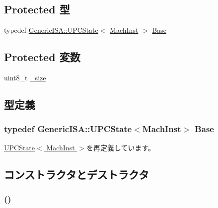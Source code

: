 \subsection*{Protected 型}
\begin{DoxyCompactItemize}
\item 
typedef \hyperlink{classGenericISA_1_1UPCState}{GenericISA::UPCState}$<$ \hyperlink{namespaceX86ISA_a7ceadb544bf9b4a10579b7466b0ac008}{MachInst} $>$ \hyperlink{classX86ISA_1_1PCState_aa6c21965de6773cbfc732c23d7263a9f}{Base}
\end{DoxyCompactItemize}
\subsection*{Protected 変数}
\begin{DoxyCompactItemize}
\item 
uint8\_\-t \hyperlink{classX86ISA_1_1PCState_aaa049a794bf092e892763bad507598b5}{\_\-size}
\end{DoxyCompactItemize}


\subsection{型定義}
\hypertarget{classX86ISA_1_1PCState_aa6c21965de6773cbfc732c23d7263a9f}{
\subsubsection[{Base}]{\setlength{\rightskip}{0pt plus 5cm}typedef {\bf GenericISA::UPCState}$<${\bf MachInst}$>$ {\bf Base}}}
\label{classX86ISA_1_1PCState_aa6c21965de6773cbfc732c23d7263a9f}


\hyperlink{classGenericISA_1_1UPCState_a6d61e15302422cb743d88ee2ca4fd482}{UPCState$<$ MachInst $>$}を再定義しています。

\subsection{コンストラクタとデストラクタ}
\hypertarget{classX86ISA_1_1PCState_af0fc4eddc36ef2caf56cce899bb3e252}{
\subsubsection[{PCState}]{ ()}}
\label{classX86ISA_1_1PCState_af0fc4eddc36ef2caf56cce899bb3e252}



